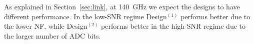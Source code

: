 As explained in Section~\ref{sec:link}, at \SI{140}{GHz} we expect the designs to have different performance. In the low-SNR regime Design$^{(1)}$ performs better due to the lower NF, while Design$^{(2)}$ performs better in the high-SNR regime due to the larger number of ADC bits.












